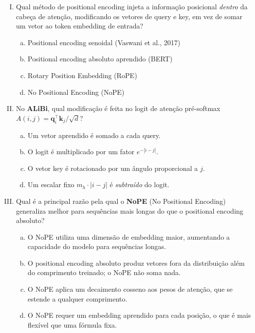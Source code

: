 \documentclass{dlproblemset}
\begin{document}
\begin{enumerate}[I)]
\item Qual método de positional encoding injeta a informação posicional \emph{dentro}
      da cabeça de atenção, modificando os vetores de query e key, em vez de somar um
      vetor ao token embedding de entrada?

\begin{enumerate}[a)]
    \item Positional encoding senoidal (Vaswani et al., 2017)
    \item Positional encoding absoluto aprendido (BERT)
    \item Rotary Position Embedding (RoPE)
    \item No Positional Encoding (NoPE)
\end{enumerate}

\item No \textbf{ALiBi}, qual modificação é feita no logit de atenção pré-softmax
      $A(i,j) = \mathbf{q}_i^\top \mathbf{k}_j / \sqrt{d}$?

\begin{enumerate}[a)]
    \item Um vetor aprendido é somado a cada query.
    \item O logit é multiplicado por um fator $e^{-|i-j|}$.
    \item O vetor key é rotacionado por um ângulo proporcional a $j$.
    \item Um escalar fixo $m_h \cdot |i - j|$ é \emph{subtraído} do logit.
\end{enumerate}

\item Qual é a principal razão pela qual o \textbf{NoPE} (No Positional Encoding)
      generaliza melhor para sequências mais longas do que o positional encoding absoluto?

\begin{enumerate}[a)]
    \item O NoPE utiliza uma dimensão de embedding maior, aumentando a capacidade
          do modelo para sequências longas.
    \item O positional encoding absoluto produz vetores fora da distribuição além
          do comprimento treinado; o NoPE não soma nada.
    \item O NoPE aplica um decaimento cosseno aos pesos de atenção, que se estende
          a qualquer comprimento.
    \item O NoPE requer um embedding aprendido para cada posição, o que é mais
          flexível que uma fórmula fixa.
\end{enumerate}


\end{enumerate}
\end{document}
